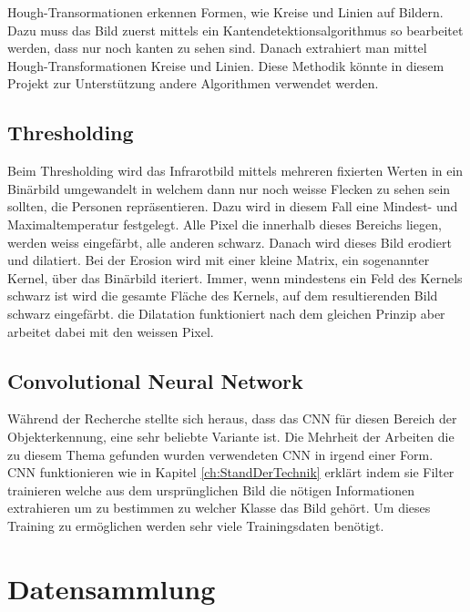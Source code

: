 Hough-Transormationen erkennen Formen, wie Kreise und Linien auf Bildern. Dazu muss das Bild zuerst mittels ein Kantendetektionsalgorithmus so bearbeitet werden, dass nur noch kanten zu sehen sind. Danach extrahiert man mittel Hough-Transformationen Kreise und Linien. Diese Methodik könnte in diesem Projekt zur Unterstützung andere Algorithmen verwendet werden.


\subsection{Thresholding}

Beim Thresholding wird das Infrarotbild mittels mehreren fixierten Werten in ein Binärbild umgewandelt in welchem dann nur noch weisse Flecken zu sehen sein sollten, die Personen repräsentieren. Dazu wird in diesem Fall eine Mindest- und Maximaltemperatur festgelegt. Alle Pixel die innerhalb dieses Bereichs liegen, werden weiss eingefärbt, alle anderen schwarz. Danach wird dieses Bild erodiert und dilatiert. Bei der Erosion wird mit einer kleine Matrix, ein sogenannter Kernel, über das Binärbild iteriert. Immer, wenn mindestens ein Feld des Kernels schwarz ist wird die gesamte Fläche des Kernels, auf dem resultierenden Bild schwarz eingefärbt. die Dilatation funktioniert nach dem gleichen Prinzip aber arbeitet dabei mit den weissen Pixel.

\subsection{Convolutional Neural Network}

Während der Recherche stellte sich heraus, dass das \gls{CNN} für diesen Bereich der Objekterkennung, eine sehr beliebte Variante ist. Die Mehrheit der Arbeiten die zu diesem Thema gefunden wurden verwendeten \gls{CNN} in irgend einer Form.\\
\gls{CNN} funktionieren wie in Kapitel \ref{ch:StandDerTechnik} erklärt indem sie Filter trainieren welche aus dem ursprünglichen Bild die nötigen Informationen extrahieren um zu bestimmen zu welcher Klasse das Bild gehört. Um dieses Training zu ermöglichen werden sehr viele Trainingsdaten benötigt.

\section{Datensammlung}

